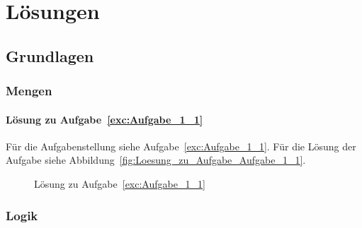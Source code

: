 \part{Lösungen}
\chapter{Grundlagen}
\section{Mengen}
\subsection{Lösung zu Aufgabe~\ref{exc:Aufgabe_1_1}}
Für die Aufgabenstellung siehe Aufgabe~\vref{exc:Aufgabe_1_1}. Für die Lösung der Aufgabe siehe Abbildung~\vref{fig:Loesung_zu_Aufgabe_Aufgabe_1_1}.
\label{loe:Aufgabe_1_1}
\begin{figure}[htb]
\centering

\caption{Lösung zu Aufgabe~\ref{exc:Aufgabe_1_1}}
\label{fig:Loesung_zu_Aufgabe_Aufgabe_1_1}
\end{figure}

\section{Logik}
